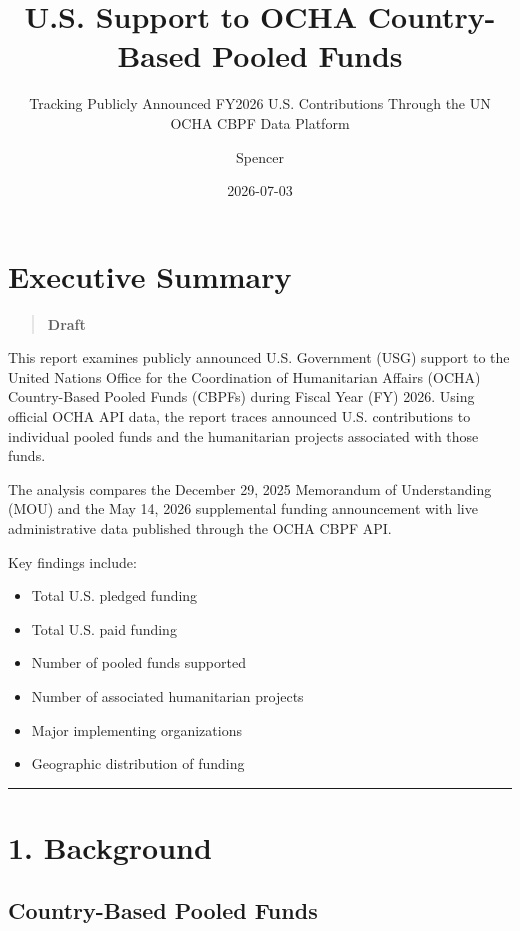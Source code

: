 \documentclass[
  11pt,
  letterpaper,
  DIV=11,
  numbers=noendperiod]{scrartcl}
\title{U.S. Support to OCHA Country-Based Pooled Funds}
\subtitle{Tracking Publicly Announced FY2026 U.S. Contributions Through
the UN OCHA CBPF Data Platform}
\author{Spencer}
\date{2026-07-03}
\providecommand{\tightlist}{%
  \setlength{\itemsep}{0pt}\setlength{\parskip}{0pt}}
\renewcommand*\contentsname{Table of contents}
\newcommand\contentsname{Table of contents}
\begin{document}
\maketitle

\renewcommand*\contentsname{Table of contents}
{
\setcounter{tocdepth}{3}
\tableofcontents
}

\section{Executive Summary}\label{executive-summary}

\begin{quote}
\textbf{Draft}
\end{quote}

This report examines publicly announced U.S. Government (USG) support to
the United Nations Office for the Coordination of Humanitarian Affairs
(OCHA) Country-Based Pooled Funds (CBPFs) during Fiscal Year (FY) 2026.
Using official OCHA API data, the report traces announced U.S.
contributions to individual pooled funds and the humanitarian projects
associated with those funds.

The analysis compares the December 29, 2025 Memorandum of Understanding
(MOU) and the May 14, 2026 supplemental funding announcement with live
administrative data published through the OCHA CBPF API.

Key findings include:

\begin{itemize}
\tightlist
\item
  Total U.S. pledged funding
\item
  Total U.S. paid funding
\item
  Number of pooled funds supported
\item
  Number of associated humanitarian projects
\item
  Major implementing organizations
\item
  Geographic distribution of funding
\end{itemize}

\begin{center}\rule{0.5\linewidth}{0.5pt}\end{center}

\section{1. Background}\label{background}

\subsection{Country-Based Pooled
Funds}\label{country-based-pooled-funds}
\end{document}
